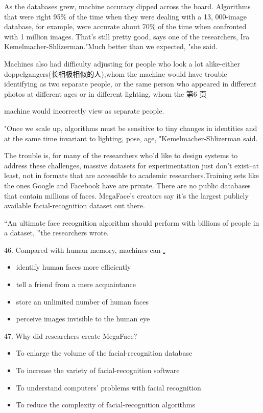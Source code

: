 \documentclass[UTF8,11pt]{ctexart}
\begin{document}
As the databases grew, machine accuracy dipped across the board. Algorithms that were right 95\% of the time when they were dealing with a 13, 000-image database, for example, were accurate about 70\% of the time when confronted with 1 million images. That's still pretty good, says one of the researchers, Ira Kemelmacher-Shlizerman."Much better than we expected, "she said.


Machines also had difficulty adjusting for people who look a lot alike-either doppelgangers(长相极相似的人),whom the machine would have trouble identifying as two separate people, or the same person who appeared in different photos at different ages or in different lighting, whom the 第6 页


machine would incorrectly view as separate people.


"Once we scale up, algorithms must be sensitive to tiny changes in identities and at the same time invariant to lighting, pose, age, "Kemelmacher-Shlizerman said.


The trouble is, for many of the researchers who'd like to design systems to address these challenges, massive datasets for experimentation just don't exist--at least, not in formats that are accessible to academic researchers.Training sets like the ones Google and Facebook have are private. There are no public databases that contain millions of faces. MegaFace's creators say it's the largest publicly available facial-recognition dataset out there.


“An ultimate face recognition algorithm should perform with billions of people in a dataset, ”the researchers wrote.


46. Compared with human memory, machines can \uline{.}


\begin{itemize}[leftmargin=2em,itemsep=.2em,topsep=.4em]\item[A.] identify human faces more efficiently
\item[B.] tell a friend from a mere acquaintance
\item[C.] store an unlimited number of human faces
\item[D.] perceive images invisible to the human eye
\end{itemize}

47. Why did researchers create MegaFace?


\begin{itemize}[leftmargin=2em,itemsep=.2em,topsep=.4em]\item[A.] To enlarge the volume of the facial-recognition database
\item[B.] To increase the variety of facial-recognition software
\item[C.] To understand computers' problems with facial recognition
\item[D.] To reduce the complexity of facial-recognition algorithms
\end{itemize}
\end{document}
